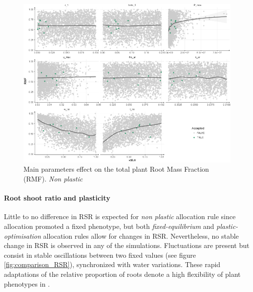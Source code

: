 \begin{figure}\label{fig:sensitivity_RSR}
\includegraphics[width = \textwidth]{./2_PP/Figures/Calibration/par_effect_none_RSR.png}
\caption{Main parameters effect on the total plant Root Mass Fraction (RMF). \textit{Non plastic}}
\end{figure}


\paragraph{Root shoot ratio and plasticity}

Little to no difference in RSR is expected for \textit{non plastic} allocation rule since allocation promoted a fixed phenotype, but both \textit{fixed-equilibrium} and \textit{plastic-optimisation} allocation rules allow for changes in RSR. Nevertheless, no stable change in RSR is observed in any of the simulations. Fluctuations are present but consist in stable oscillations between two fixed values (see figure \ref{fig:comparison_RSR}), synchronized with water variations. These rapid adaptations of the relative proportion of roots denote a high flexibility of plant phenotypes in \model.


